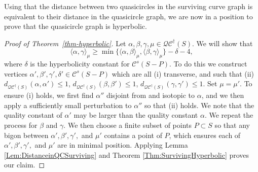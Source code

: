 \documentclass[12pt,a4paper]{amsart}
\theoremstyle{definition}
\theoremstyle{plain}
\numberwithin{equation}{section}
\newcommand{\qcg}{\mathcal{QC}^{\dagger}}
\begin{document}
Using that the distance between two quasicircles in the surviving curve graph is equivalent to their distance in the quasicircle graph, we are now in a position to prove that the quasicircle graph is hyperbolic.


\begin{proof}[Proof of Theorem~\ref{thm-hyperbolic}]
    Let $\alpha, \beta, \gamma, \mu \in \qcg(S)$. We will show that
    \[
        \langle \alpha, \gamma\rangle_{\mu} \geq \min\{ \langle \alpha, \beta\rangle_{\mu}, \langle \beta, \gamma\rangle_{\mu} \} - \delta - 4,
    \]
    where $\delta$ is the hyperbolicity constant for $\mathcal{C}^{s}(S -P)$. To do this we construct vertices $\alpha', \beta', \gamma', \delta' \in \mathcal{C}^{s}(S -P)$ which are all (i) transverse, and such that (ii) $d_{\qcg(S)}(\alpha,\alpha') \leq 1$, $d_{\qcg(S)}(\beta,\beta') \leq 1$, $d_{\qcg(S)}(\gamma,\gamma')\leq 1$.
    Set $\mu = \mu'$.
    To ensure (i) holds, we first find $\alpha''$ disjoint from and isotopic to $\alpha$, and we then apply a sufficiently small perturbation to $\alpha''$ so that (ii) holds.
    We note that the quality constant of $\alpha'$ may be larger than the quality constant $\alpha$.
    We repeat the process for $\beta$ and $\gamma$.
    We then choose a finite subset of points $P \subset S$ so that any bigon between $\alpha', \beta', \gamma',$ and $\mu'$ contains a point of $P$, which ensures each of $\alpha', \beta', \gamma',$ and $\mu'$ are in minimal position.
    Applying Lemma \ref{Lem:DistanceinQCSurviving} and Theorem \ref{Thm:SurvivingHyperbolic} proves our claim.
\end{proof}



\end{document}
